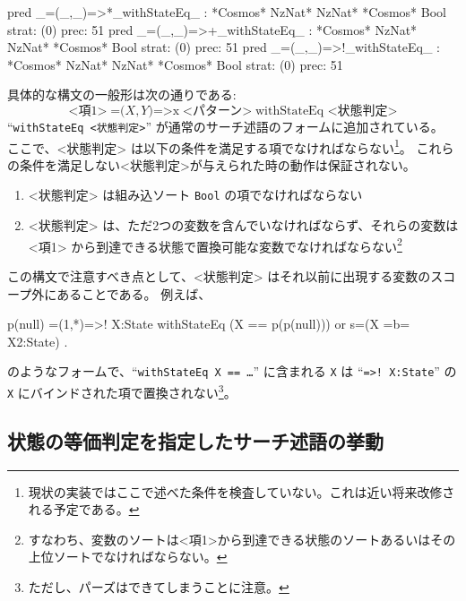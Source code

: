 \documentclass{article}
\begin{document}
\begin{simplev}
pred _=(_,_)=>*_withStateEq_ : *Cosmos* NzNat* NzNat* *Cosmos* Bool { strat: (0) prec: 51 }
pred _=(_,_)=>+_withStateEq_ : *Cosmos* NzNat* NzNat* *Cosmos* Bool { strat: (0) prec: 51 }
pred _=(_,_)=>!_withStateEq_ : *Cosmos* NzNat* NzNat* *Cosmos* Bool { strat: (0) prec: 51 }
\end{simplev}

具体的な構文の一般形は次の通りである:
\[\mbox{<項1>}\;\mbox{=(} X, Y \mbox{)=>x}\; \mbox{<パターン>}\;\mbox{withStateEq <状態判定>} \]
``\texttt{withStateEq <状態判定>}'' が通常のサーチ述語のフォームに追加されている。
ここで、<状態判定> は以下の条件を満足する項でなければならない\footnote{現状の実装ではここで述べた条件を検査していない。これは近い将来改修される予定である。}。
これらの条件を満足しない<状態判定>が与えられた時の動作は保証されない。
\begin{enumerate}
\item <状態判定> は組み込ソート \texttt{Bool} の項でなければならない
\item <状態判定> は、ただ2つの変数を含んでいなければならず、それらの変数は <項1> から到達できる状態で置換可能な変数でなければならない\footnote{すなわち、変数のソートは<項1>から到達できる状態のソートあるいはその上位ソートでなければならない。}
\end{enumerate}

この構文で注意すべき点として、<状態判定> はそれ以前に出現する変数のスコープ外にあることである。
例えば、
\begin{simplev}
 p(null) =(1,*)=>! X:State withStateEq (X == p(p(null))) or s=(X =b= X2:State) .
\end{simplev}
のようなフォームで、``\texttt{withStateEq X == \ldots}'' に含まれる \texttt{X}  は ``\verb|=>! X:State|'' の \texttt{X} にバインドされた項で置換されない\footnote{ただし、パーズはできてしまうことに注意。}。

\subsection{状態の等価判定を指定したサーチ述語の挙動}
\label{sec:state-eq-behaviour}
\end{document}
